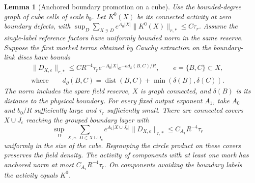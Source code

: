 \documentclass[11pt]{article}
\newtheorem{lemma}[theorem]{Lemma}
\theoremstyle{definition}
\begin{document}
\begin{lemma}[Anchored boundary promotion on a cube]
\label{lem:anchored-boundary-promotion}
Use the bounded-degree graph of cube cells of scale \(b_0\).
Let \(K^0(X)\) be its connected
activity at zero boundary defects, with
\(\sup_D\sum_{X\ni D} e^{A_0|X|}\|K^0(X)\|_{r,*}\le C\tau_r\).
Assume the single-label reference factors have uniformly bounded
norm in the same reserve. Suppose the first marked
terms obtained by Cauchy extraction on the boundary-link
discs have bounds
\begin{equation}
 \begin{aligned}
 \|D_{X,e}\|_{r,*}\le C R^{-4}\tau_r
   e^{-A_0|X|}
   e^{-a d_\partial(B,C)/R},\qquad e=\{B,C\}\subset X,\\
 \text{where}\qquad
 d_\partial(B,C)=\operatorname{dist}(B,C)
                +\min(\delta(B),\delta(C)).
 \end{aligned}
\end{equation}
The norm includes the spare field reserve, \(X\) is graph connected,
and \(\delta(B)\) is its distance to the physical boundary.
For every fixed output exponent \(A_1\), take \(A_0\) and
\(b_0/R\) sufficiently large and \(\tau_r\) sufficiently small.
There are connected covers \(X\cup J_e\) reaching the grouped
boundary layer with
\begin{equation}
 \sup_D\sum_{X,e:\ D\in X\cup J_e}
 e^{A_1|X\cup J_e|}\|D_{X,e}\|_{r,*}\le C_{A_1}R^{-4}\tau_r
\end{equation}
uniformly in the size of the cube. Regrouping the circle product on
these covers preserves the field density. The activity of components
with at least one mark has anchored norm at most \(C_{A_1}R^{-4}\tau_r\).
On components avoiding the boundary labels the activity equals \(K^0\).
\end{lemma}
\end{document}
